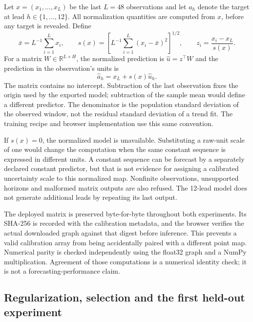 Let $x=(x_1,\ldots,x_L)$ be the last $L=48$ observations and let $a_h$ denote
the target at lead $h\in\{1,\ldots,12\}$. All normalization quantities are
computed from $x$, before any target is revealed. Define
\begin{equation}
 \bar x=L^{-1}\sum_{i=1}^L x_i,\qquad
 s(x)=\left[L^{-1}\sum_{i=1}^L(x_i-\bar x)^2\right]^{1/2},\qquad
 z_i=\frac{x_i-x_L}{s(x)}.
 \label{eq:browser-normalization}
\end{equation}
For a matrix $W\in\mathbb R^{L\times H}$, the normalized prediction is
$\hat u=z^\top W$ and the prediction in the observation's units is
\begin{equation}
 \hat a_h=x_L+s(x)\hat u_h.
 \label{eq:browser-inverse}
\end{equation}
The matrix contains no intercept. Subtraction of the last observation fixes the
origin used by the exported model; subtraction of the sample mean would define
a different predictor. The denominator is the population standard deviation of
the observed window, not the residual standard deviation of a trend fit. The
training recipe and browser implementation use this same convention.

If $s(x)=0$, the normalized model is unavailable. Substituting a raw-unit scale
of one would change the computation when the same constant sequence is expressed
in different units. A constant sequence can be forecast by a separately declared
constant predictor, but that is not evidence for assigning a calibrated
uncertainty scale to this normalized map. Nonfinite observations, unsupported
horizons and malformed matrix outputs are also refused. The 12-lead model does
not generate additional leads by repeating its last output.

The deployed matrix is preserved byte-for-byte throughout both experiments.
Its SHA-256 is recorded with the calibration metadata, and the browser verifies
the actual downloaded graph against that digest before inference. This prevents
a valid calibration array from being accidentally paired with a different
point map. Numerical parity is checked independently using the float32 graph
and a NumPy multiplication. Agreement of those computations is a numerical
identity check; it is not a forecasting-performance claim.

\subsection{Regularization, selection and the first held-out experiment}
\label{sec:browser-ridge}

